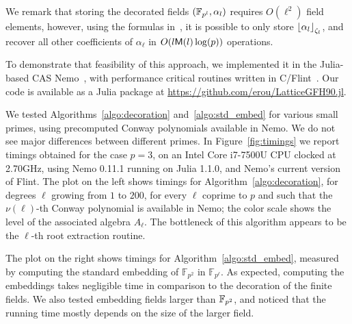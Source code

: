 \documentclass{sig-alternate}
\begin{document}
We remark that storing the decorated fields $(\mathbb{F}_{p^l},\alpha_l)$
requires $O(\ell^2)$ field elements, however, using the formulas
in~\cite{Allombert02,brieulle2018computing}, it is possible to only
store $\left\lfloor \alpha_l \right\rfloor_{\zeta_l}$, and recover all other
coefficients of $\alpha_\ell$ in $O(l\mathsf{M}(l)\log(p))$ operations.

To demonstrate that feasibility of this approach, we implemented it in
the Julia-based CAS Nemo~\cite{Fieker:2017:NCA:3087604.3087611}, with
performance critical routines written in C/Flint~\cite{flint}. %
Our code is available as a Julia package at
\url{https://github.com/erou/LatticeGFH90.jl}.

We tested Algorithms~\ref{algo:decoration} and~\ref{algo:std_embed}
for various small primes, using precomputed Conway polynomials
available in Nemo. %
We do not see major differences between different primes. %
In Figure~\ref{fig:timings} we report timings obtained for the case
$p=3$, on an Intel Core i7-7500U CPU clocked at 2.70GHz, using Nemo
0.11.1 running on Julia 1.1.0, and Nemo's current version of Flint. %
The plot on the left shows timings for
Algorithm~\ref{algo:decoration}, for degrees $\ell$ growing from $1$
to $200$, for every $\ell$ coprime to $p$ and such that the
$\nu(\ell)$-th Conway polynomial is available in Nemo; the color scale
shows the level of the associated algebra $A_\ell$. %
The bottleneck of this algorithm appears to be the $\ell$-th root
extraction routine.

The plot on the right shows timings for
Algorithm~\ref{algo:std_embed}, measured by computing the standard
embedding of $\mathbb{F}_{p^2}$ in $\mathbb{F}_{p^\ell}$. %
As expected, computing the embeddings takes negligible time in
comparison to the decoration of the finite fields. %
We also tested embedding fields larger than $\mathbb{F}_{p^2}$, and noticed
that the running time mostly depends on the size of the larger field.
\end{document}
